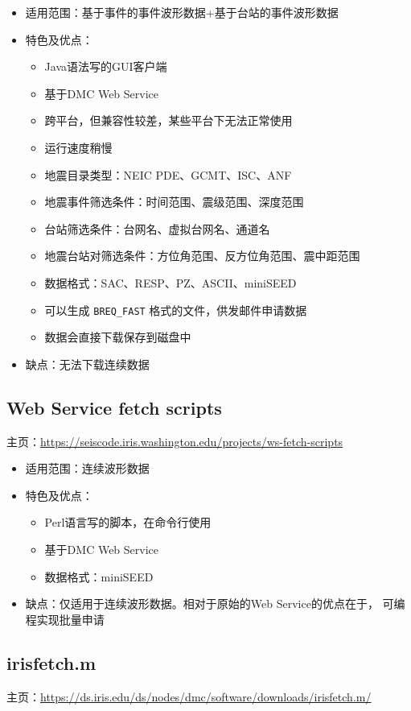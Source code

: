 \begin{itemize}
\item 适用范围：基于事件的事件波形数据+基于台站的事件波形数据
\item 特色及优点：
    \begin{itemize}
    \item Java语法写的GUI客户端
    \item 基于DMC Web Service
    \item 跨平台，但兼容性较差，某些平台下无法正常使用
    \item 运行速度稍慢
    \item 地震目录类型：NEIC PDE、GCMT、ISC、ANF
    \item 地震事件筛选条件：时间范围、震级范围、深度范围
    \item 台站筛选条件：台网名、虚拟台网名、通道名
    \item 地震台站对筛选条件：方位角范围、反方位角范围、震中距范围
    \item 数据格式：SAC、RESP、PZ、ASCII、miniSEED
    \item 可以生成 \verb|BREQ_FAST| 格式的文件，供发邮件申请数据
    \item 数据会直接下载保存到磁盘中
    \end{itemize}
\item 缺点：无法下载连续数据
\end{itemize}

\subsection{Web Service fetch scripts}
主页：\url{https://seiscode.iris.washington.edu/projects/ws-fetch-scripts}

\begin{itemize}
\item 适用范围：连续波形数据
\item 特色及优点：
    \begin{itemize}
    \item Perl语言写的脚本，在命令行使用
    \item 基于DMC Web Service
    \item 数据格式：miniSEED
    \end{itemize}
\item 缺点：仅适用于连续波形数据。相对于原始的Web Service的优点在于，
    可编程实现批量申请
\end{itemize}

\subsection{irisfetch.m}
主页：\url{https://ds.iris.edu/ds/nodes/dmc/software/downloads/irisfetch.m/}

